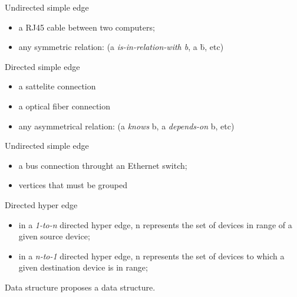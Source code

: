\documentclass{beamer}
\begin{document}
\begin{frame}{Undirected simple edge}
\begin{itemize}
  \item a RJ45 cable between two computers;
  \item any symmetric relation: (a \textit{is-in-relation-with b}, a \= b, etc)
\end{itemize}
\end{frame}

\begin{frame}{Directed simple edge}
\begin{itemize}
  \item a sattelite connection
  \item a optical fiber connection
  \item any asymmetrical relation: (a \textit{knows} b, a \textit{depends-on} b, etc)
\end{itemize}
\end{frame}


\begin{frame}{Undirected simple edge}
\begin{itemize}
  \item a bus connection throught an Ethernet switch;
  \item vertices that must be grouped
\end{itemize}
\end{frame}

\begin{frame}{Directed hyper edge}
\begin{itemize}
  \item in a \textit{1-to-n} directed hyper edge, n represents the set of devices in range of a given source device;
  \item in a \textit{n-to-1} directed hyper edge, n represents the set of devices to which a given destination device is in range;
\end{itemize}
\end{frame}




\begin{frame}{Data structure}
\grph proposes a data structure.

\end{frame}
\end{document}
